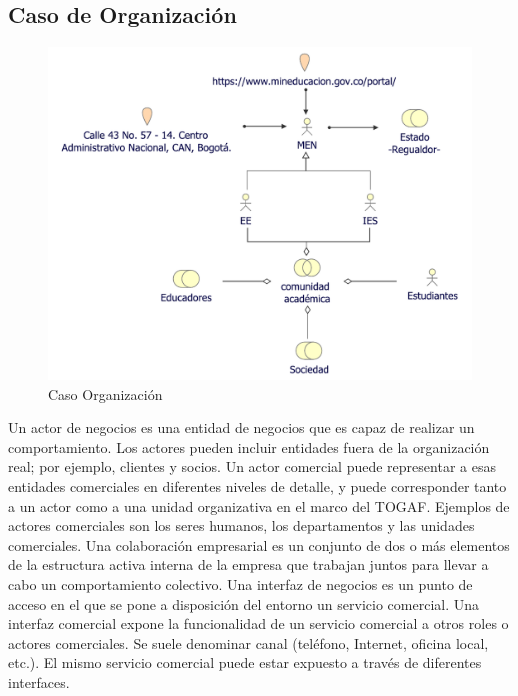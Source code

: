 \newpage
\subsection{Caso  de Organización}
\begin{figure}[h!]
	\centering
	\includegraphics[width=.9\linewidth]{imgs/caso/negocio/organizacion}
	\caption{Caso Organización}
\end{figure}
Un actor de negocios es una entidad de negocios que es capaz de realizar un comportamiento. Los actores pueden incluir entidades fuera de la organización real; por ejemplo, clientes y socios. Un actor comercial puede representar a esas entidades comerciales en diferentes niveles de detalle, y puede corresponder tanto a un actor como a una unidad organizativa en el marco del TOGAF. Ejemplos de actores comerciales son los seres humanos, los departamentos y las unidades comerciales. Una colaboración empresarial es un conjunto de dos o más elementos de la estructura activa interna de la empresa que trabajan juntos para llevar a cabo un comportamiento colectivo. Una interfaz de negocios es un punto de acceso en el que se pone a disposición del entorno un servicio comercial. Una interfaz comercial expone la funcionalidad de un servicio comercial a otros roles o actores comerciales. Se suele denominar canal (teléfono, Internet, oficina local, etc.). El mismo servicio comercial puede estar expuesto a través de diferentes interfaces.
